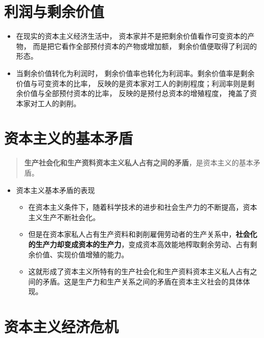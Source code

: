 \documentclass[
]{article}
\begin{document}
\hypertarget{ux5229ux6da6ux4e0eux5269ux4f59ux4ef7ux503c}{%
\section{利润与剩余价值}\label{ux5229ux6da6ux4e0eux5269ux4f59ux4ef7ux503c}}

\begin{itemize}
\item
  在现实的资本主义经济生活中，
  资本家并不是把剩余价值看作可变资本的产物，
  而是把它看作全部预付资本的产物或增加额， 剩余价值便取得了利润的形态。
\item
  当剩余价值转化为利润时，
  剩余价值率也转化为利润率。剩余价值率是剩余价值与可变资本的比率，
  反映的是资本家对工人的剥削程度；利润率则是剩余价值与全部预付资本的比率，
  反映的是预付总资本的增殖程度， 掩盖了资本家对工人的剥削。
\end{itemize}

\hypertarget{ux8d44ux672cux4e3bux4e49ux7684ux57faux672cux77dbux76fe}{%
\section{资本主义的基本矛盾}\label{ux8d44ux672cux4e3bux4e49ux7684ux57faux672cux77dbux76fe}}

\begin{quote}
\textbf{生产社会化和生产资料资本主义私人占有之间的矛盾}，是资本主义的基本矛盾。
\end{quote}

\begin{itemize}
\item
  资本主义基本矛盾的表现

  \begin{itemize}
  \item
    在资本主义条件下，随着科学技术的进步和社会生产力的不断提高，资本主义生产不断社会化。
  \item
    但是在资本家私人占有生产资料和剥削雇佣劳动者的生产关系中，\textbf{社会化的生产力却变成资本的生产力}，变成资本高效能地榨取剩余劳动、占有剩余价值、实现价值增殖的能力。
  \item
    这就形成了资本主义所特有的生产社会化和生产资料资本主义私人占有之间的矛盾。这是生产力和生产关系之间的矛盾在资本主义社会的具体体现。
  \end{itemize}
\end{itemize}

\hypertarget{ux8d44ux672cux4e3bux4e49ux7ecfux6d4eux5371ux673a}{%
\section{资本主义经济危机}\label{ux8d44ux672cux4e3bux4e49ux7ecfux6d4eux5371ux673a}}
\end{document}
